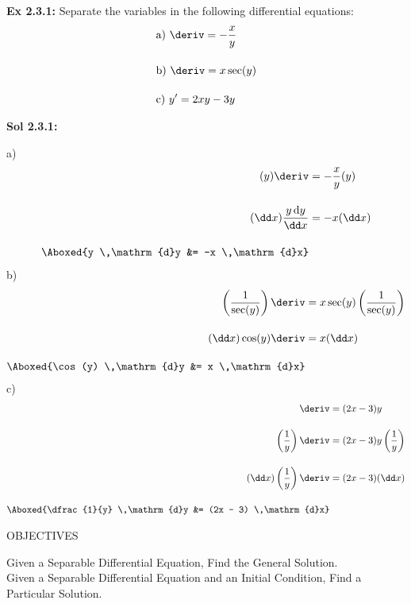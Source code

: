 \begin{tcolorbox}[example]
    \textbf{Ex 2.3.1: } Separate the variables in the following differential equations: \begin{align*}
        & \text{a) } \deriv = -\dfrac{x}{y} \\[11pt]
        & \text{b) } \deriv = x\sec (y) \\[11pt]
        & \text{c) } y' = 2xy - 3y
    \end{align*}
\end{tcolorbox}
\begin{tcolorbox}[solution]
    \textbf{Sol 2.3.1: } \par
    a) \begin{align*}
        (y)\deriv &= -\dfrac{x}{y}(y) \\[11pt]
        (\dd x)\dfrac{y \,\mathrm{d}y}{\dd x} &= -x(\dd x) \\[11pt]
        \Aboxed{y \,\mathrm{d}y &= -x \,\mathrm{d}x}
    \end{align*}
    b) \begin{align*}
        \left(\dfrac{1}{\sec (y)}\right)\deriv &= x\sec (y)\left(\dfrac{1}{\sec (y)}\right) \\[11pt]
        (\dd x)\cos (y)\deriv &= x(\dd x) \\[11pt]
        \Aboxed{\cos (y) \,\mathrm{d}y &= x \,\mathrm{d}x}
    \end{align*}
    c) \begin{align*}
        \deriv &= (2x - 3)y \\[11pt]
        \left(\dfrac{1}{y}\right)\deriv &= (2x - 3)y\left(\dfrac{1}{y}\right) \\[11pt]
        (\dd x)\left(\dfrac{1}{y}\right)\deriv &= (2x - 3)(\dd x) \\[11pt]
        \Aboxed{\dfrac{1}{y} \,\mathrm{d}y &= (2x - 3) \,\mathrm{d}x}
    \end{align*}
\end{tcolorbox} \vspace{11pt}

\begin{tcolorbox}[objective]
    \begin{center}
        OBJECTIVES \\[11pt]
    \end{center}
    Given a Separable Differential Equation, Find the General Solution. \\
    Given a Separable Differential Equation and an Initial Condition, Find a Particular Solution. 
\end{tcolorbox} \vspace{11pt}

